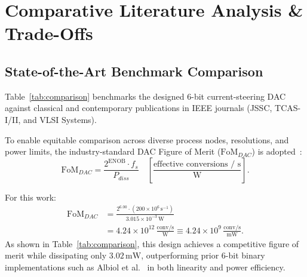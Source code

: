 \documentclass[conference,10pt]{IEEEtran}
\begin{document}
\section{Comparative Literature Analysis \& Trade-Offs}

\subsection{State-of-the-Art Benchmark Comparison}
Table~\ref{tab:comparison} benchmarks the designed 6-bit current-steering DAC against classical and contemporary publications in IEEE journals (JSSC, TCAS-I/II, and VLSI Systems).

To enable equitable comparison across diverse process nodes, resolutions, and power limits, the industry-standard DAC Figure of Merit ($\text{FoM}_{DAC}$) is adopted~\cite{merritt_high_speed_dac}:
\begin{equation}
\text{FoM}_{DAC} = \frac{2^{\text{ENOB}} \cdot f_s}{P_{diss}} \quad \left[ \frac{\text{effective conversions / s}}{\text{W}} \right].
\end{equation}

For this work:
\begin{align}
\text{FoM}_{DAC} &= \frac{2^{6.00} \cdot (200 \times 10^6\,\text{s}^{-1})}{3.015 \times 10^{-3}\,\text{W}} \nonumber \\
                 &= 4.24 \times 10^{12}\,\frac{\text{conv/s}}{\text{W}} \equiv 4.24 \times 10^{9}\,\frac{\text{conv/s}}{\text{mW}}.
\end{align}
As shown in Table~\ref{tab:comparison}, this design achieves a competitive figure of merit while dissipating only $3.02\,\text{mW}$, outperforming prior 6-bit binary implementations such as Albiol et al.~\cite{albiol_mismatch_yield} in both linearity and power efficiency.
\end{document}
